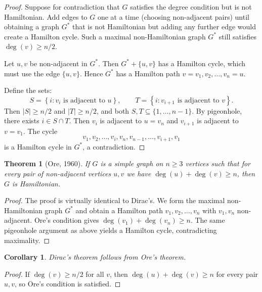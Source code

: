 \documentclass[12pt,a4paper,openany]{book}
\theoremstyle{definition}
\theoremstyle{plain}
\newtheorem{theorem}[definition]{Theorem}
\newtheorem{corollary}[definition]{Corollary}
\theoremstyle{remark}
\newcommand{\abs}[1]{\left|#1\right|}
\newcommand{\set}[1]{\left\{#1\right\}}
\begin{document}
\begin{proof}
Suppose for contradiction that $G$ satisfies the degree condition but is
not Hamiltonian.  Add edges to $G$ one at a time (choosing non-adjacent
pairs) until obtaining a graph $G^*$ that is not Hamiltonian but adding
any further edge would create a Hamilton cycle.  Such a maximal
non-Hamiltonian graph $G^*$ still satisfies $\deg(v)\ge n/2$.

Let $u,v$ be non-adjacent in $G^*$.  Then $G^*+\{u,v\}$ has a Hamilton
cycle, which must use the edge $\{u,v\}$.  Hence $G^*$ has a Hamilton
path $v=v_1,v_2,\dots,v_n=u$.

Define the sets:
\[
  S=\set{i : v_i \text{ is adjacent to } u},\qquad
  T=\set{i : v_{i+1} \text{ is adjacent to } v}.
\]
Then $\abs{S}\ge n/2$ and $\abs{T}\ge n/2$, and both $S,T\subseteq
\{1,\dots,n-1\}$.  By pigeonhole, there exists $i\in S\cap T$.  Then
$v_i$ is adjacent to $u=v_n$ and $v_{i+1}$ is adjacent to $v=v_1$.
The cycle
\[
  v_1,v_2,\dots,v_i,v_n,v_{n-1},\dots,v_{i+1},v_1
\]
is a Hamilton cycle in $G^*$, a contradiction.
\end{proof}

\begin{theorem}[Ore, 1960]
\label{thm:ore}
If $G$ is a simple graph on $n\ge 3$ vertices such that for every
pair of non-adjacent vertices $u,v$ we have
$\deg(u)+\deg(v)\ge n$, then $G$ is Hamiltonian.
\end{theorem}

\begin{proof}
The proof is virtually identical to Dirac's.  We form the maximal
non-Hamiltonian graph $G^*$ and obtain a Hamilton path
$v_1,v_2,\dots,v_n$ with $v_1,v_n$ non-adjacent.  Ore's condition
gives $\deg(v_1)+\deg(v_n)\ge n$.  The same pigeonhole argument as
above yields a Hamilton cycle, contradicting maximality.
\end{proof}

\begin{corollary}
\label{cor:dirac-from-ore}
Dirac's theorem follows from Ore's theorem.
\end{corollary}

\begin{proof}
If $\deg(v)\ge n/2$ for all $v$, then $\deg(u)+\deg(v)\ge n$ for every
pair $u,v$, so Ore's condition is satisfied.
\end{proof}
\end{document}
